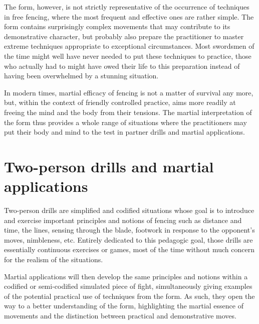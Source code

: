 The form, however, is not strictly representative of the occurrence of techniques in free fencing, where the most frequent and effective ones are rather simple.
The form contains surprisingly complex movements that may contribute to its demonstrative character, but probably also prepare the practitioner to master extreme techniques appropriate to exceptional circumstances.  
Most swordsmen of the time might well have never needed to put these techniques to practice, those who actually had to might have owed their life to this preparation instead of having been overwhelmed by a stunning situation.

In modern times, martial efficacy of \Taiji{} fencing is not a matter of survival any more, but, within the context of friendly controlled practice, aims more readily at freeing the mind and the body from their tensions.
The martial interpretation of the form thus provides a whole range of situations where the practitioners may put their body and mind to the test in partner drills and martial applications.

\section{Two-person drills and martial applications}
Two-person drills are simplified and codified situations whose goal is to introduce and exercise important principles and notions of \Taiji{} fencing such as distance and time, the lines, sensing through the blade, footwork in response to the opponent's moves, nimbleness, etc.
Entirely dedicated to this pedagogic goal, those drills are essentially continuous exercises or games, most of the time without much concern for the realism of the situations.

Martial applications will then develop the same principles and notions within a codified or semi-codified simulated piece of fight, simultaneously giving examples of the potential practical use of techniques from the form.
As such, they open the way to a better understanding of the form, highlighting the   martial essence of movements and the distinction between practical and demonstrative moves.

